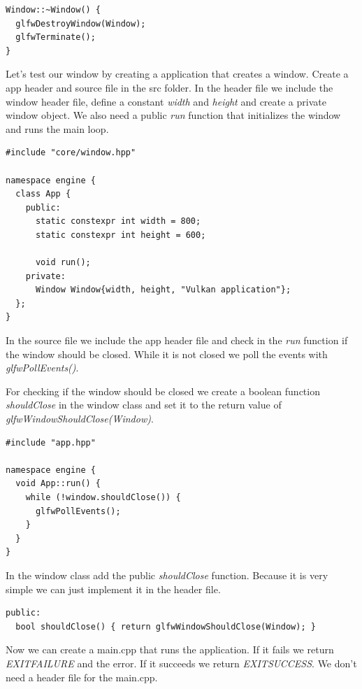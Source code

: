 \documentclass[12pt]{report} \usepackage{preamble}
\begin{document}
\begin{lstlisting}[Language=C++]
Window::~Window() {
  glfwDestroyWindow(Window);
  glfwTerminate();
}
\end{lstlisting}

Let's test our window by creating a application that creates a window.
Create a app header and source file in the src folder. In the header file we include the window header file,
define a constant \textit{width} and \textit{height} and create a private window object.
We also need a public \textit{run} function that initializes the window and runs the main loop.

\newpage

\begin{lstlisting}[Language=C++]
#include "core/window.hpp"

namespace engine {
  class App {
    public:
      static constexpr int width = 800;
      static constexpr int height = 600;

      void run();
    private:
      Window Window{width, height, "Vulkan application"};
  };
}
\end{lstlisting}

In the source file we include the app header file and check in the \textit{run} function if the window
should be closed. While it is not closed we poll the events with \textit{glfwPollEvents()}.

For checking if the window should be closed we create a boolean function \textit{shouldClose} in the
window class and set it to the return value of \textit{glfwWindowShouldClose(Window)}.

\begin{lstlisting}[Language=C++]
#include "app.hpp"

namespace engine {
  void App::run() {
    while (!window.shouldClose()) {
      glfwPollEvents();
    }
  }
} 
\end{lstlisting}

In the window class add the public \textit{shouldClose} function.
Because it is very simple we can just implement it in the header file.

\begin{lstlisting}[Language=C++]
public:
  bool shouldClose() { return glfwWindowShouldClose(Window); }
\end{lstlisting}

Now we can create a main.cpp that runs the application.
If it fails we return \\ \textit{EXIT\textunderscore FAILURE} and the error.
If it succeeds we return \textit{EXIT\textunderscore SUCCESS}.
We don't need a header file for the main.cpp.
\end{document}
